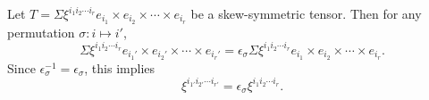 Let $T = \Sigma \xi^{i_1 i_2 \cdots i_r} e_{i_1} \times e_{i_2} \times \cdots \times e_{i_r}$ be a skew-symmetric tensor. Then for any permutation $\sigma: i \mapsto i'$,
$$\Sigma \xi^{i_1 i_2 \cdots i_r} e_{i_1'} \times e_{i_2'} \times \cdots \times e_{i_r'} = \epsilon_\sigma \Sigma \xi^{i_1 i_2 \cdots i_r} e_{i_1} \times e_{i_2} \times \cdots \times e_{i_r}. \tag{25}$$
Since $\epsilon_\sigma^{-1} = \epsilon_\sigma$, this implies
$$\xi^{i_{1'} i_{2'} \cdots i_{r'}} = \epsilon_\sigma \xi^{i_1 i_2 \cdots i_r}. \tag{26}$$
